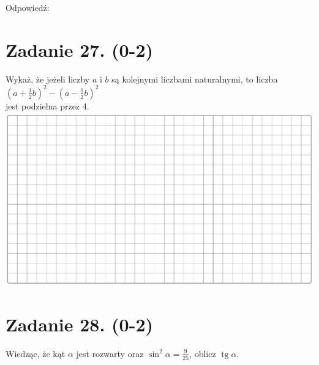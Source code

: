 \documentclass[10pt]{article}
\begin{document}
Odpowiedź: \(\qquad\)

\section*{Zadanie 27. (0-2)}
Wykaż, że jeżeli liczby \(a\) i \(b\) są kolejnymi liczbami naturalnymi, to liczba \(\left(a+\frac{1}{2} b\right)^{2}-\left(a-\frac{1}{2} b\right)^{2}\)\\
jest podzielna przez 4.\\
\includegraphics[max width=\textwidth, center]{2024_11_21_724abc2cf5a71562f5b2g-11}

\section*{Zadanie 28. (0-2)}
Wiedząc, że kąt \(\alpha\) jest rozwarty oraz \(\sin ^{2} \alpha=\frac{9}{25}\), oblicz \(\operatorname{tg} \alpha\).
\end{document}
